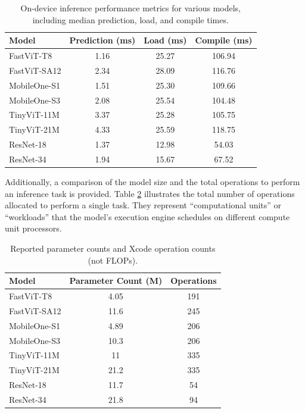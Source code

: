 \documentclass[12pt]{article}
\begin{document}
\begin{table}[tbp]
    \centering
    \doublespacing
    \captionsetup{justification=centering,margin=1cm}
    \begin{tabular}{l|c|c|c}
        \hline
        \textbf{Model} & \textbf{Prediction (ms)} & \textbf{Load (ms)} & \textbf{Compile (ms)} \\ \hline
        FastViT-T8 & 1.16 & 25.27 & 106.94 \\
        FastViT-SA12 & 2.34 & 28.09 & 116.76 \\
        MobileOne-S1 & 1.51 & 25.30 & 109.66 \\
        MobileOne-S3 & 2.08 & 25.54 & 104.48 \\
        TinyViT-11M & 3.37 & 25.28 & 105.75 \\
        TinyViT-21M & 4.33 & 25.59 & 118.75 \\
        ResNet-18 & 1.37 & 12.98 & 54.03 \\
        ResNet-34 & 1.94 & 15.67 & 67.52 \\
        \hline
    \end{tabular}
    \caption{On-device inference performance metrics for various models, including median prediction, load, and compile times.}
    \label{tab:on_device_performance}
\end{table}

Additionally, a comparison of the model size and the total operations to perform an inference task is provided. Table \ref{tab:model_params_ops} illustrates the total number of operations allocated to perform a single task. They represent ``computational units'' or ``workloads'' that the model’s execution engine schedules on different compute unit processors.

\begin{table}[tbp]
    \centering
    \doublespacing
    \captionsetup{justification=centering,margin=1cm}
    \begin{tabular}{l|c|c}
        \hline
        \textbf{Model} & \textbf{Parameter Count (M)} & \textbf{Operations} \\ \hline
        FastViT-T8 & 4.05 & 191 \\
        FastViT-SA12 & 11.6 & 245 \\
        MobileOne-S1 & 4.89 & 206 \\
        MobileOne-S3 & 10.3 & 206 \\
        TinyViT-11M & 11 & 335 \\
        TinyViT-21M & 21.2 & 335 \\
        ResNet-18 & 11.7 & 54 \\
        ResNet-34 & 21.8 & 94 \\
        \hline
    \end{tabular}
    \caption{Reported parameter counts and Xcode operation counts (not FLOPs).}
    \label{tab:model_params_ops}
\end{table}
\end{document}
